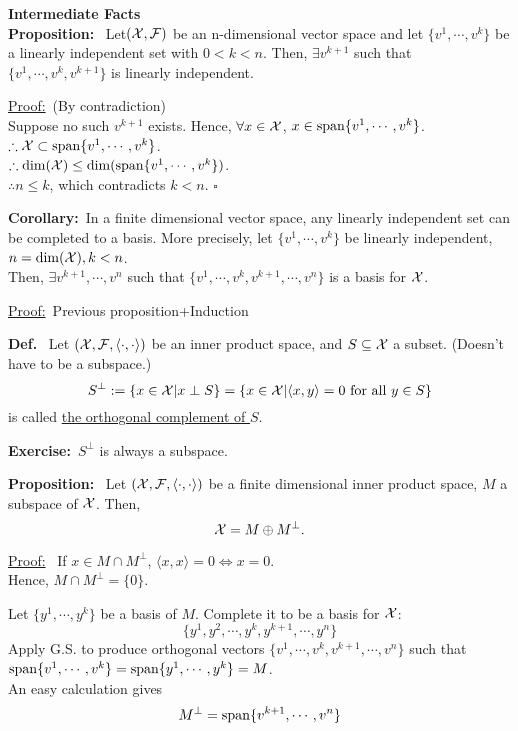\documentclass[letterpaper]{article}
\begin{document}
\noindent \textbf{Intermediate Facts}\\
\noindent \textbf{Proposition:}~ Let$(\cal X, F)$ be an n-dimensional vector space and let $\{v^1, \cdots, v^k\}$ be a linearly independent set with $0<k<n$. Then, $\exists v^{k+1}$ such that $\{v^1, \cdots, v^k, v^{k+1}\}$ is linearly independent.

\noindent \underline{Proof:}~(By contradiction)\\
    Suppose no such $v^{k+1}$ exists. Hence, $\forall x \in \cal X$, $x \in {\rm span} \{v^1, \cdots, v^k\}$.\\
    $\therefore {\cal X} \subset {\rm span} \{v^1, \cdots, v^k\}$.\\
    $\therefore {\rm dim}({\cal X}) \leq {\rm dim}({\rm span} \{v^1, \cdots, v^k\})$.\\
    $\therefore n \leq k$, which contradicts $k<n$. $\square$

\noindent \textbf{Corollary:}~In a finite dimensional vector space, any linearly independent set can be completed to a basis. More precisely, let $\{v^1, \cdots, v^k\}$ be linearly independent, $n = {\rm dim}({\cal X}), k<n$.\\
Then, $\exists v^{k+1}, \cdots, v^n$ such that $\{v^1, \cdots, v^k, v^{k+1}, \cdots, v^n\}$ is a basis for $\cal X$.

\noindent \underline{Proof:}~Previous proposition+Induction

\noindent \textbf{Def.}~ Let $({\cal X, F},  \langle \cdot,\cdot \rangle )$ be an inner product space, and $S \subseteq {\cal X}$ a subset. (Doesn't have to be a subspace.)
$$S^{\perp}:= \{x \in {\cal X}|x \perp S\} = \{x \in {\cal X}|  \langle x,y \rangle =0 \textnormal{ for all }y \in S\}$$
is called \underline{the orthogonal complement of $S$}.

\noindent \textbf{Exercise:}~$S^{\perp}$ is always a subspace.

\noindent \textbf{Proposition:}~ Let $({\cal X, F}, \langle \cdot, \cdot \rangle )$ be a finite dimensional inner product space, $M$ a subspace of $\cal X$. Then,
$${\cal X} = M \oplus M^{\perp}.$$

\noindent \underline{Proof:}~ If $x\in M\cap M^\perp$, $ \langle x,x \rangle =0 \Leftrightarrow x=0$.\\
    Hence, $M \cap M^{\perp} = \{0\}$.

    Let $\{y^1, \cdots, y^k\}$ be a basis of $M$. Complete it to be a basis for $\cal X$: $$\{y^1, y^2, \cdots, y^k, y^{k+1}, \cdots, y^n\}$$
    Apply G.S. to produce orthogonal vectors $\{v^1, \cdots, v^k, v^{k+1}, \cdots, v^n\}$ such that ${\rm span}\{v^1, \cdots, v^k\} = {\rm span}\{y^1, \cdots, y^k\} = M$.\\
    An easy calculation gives
    $$M^{\perp} = {\rm span}\{v^{k+1}, \cdots, v^n\}$$
\end{document}

